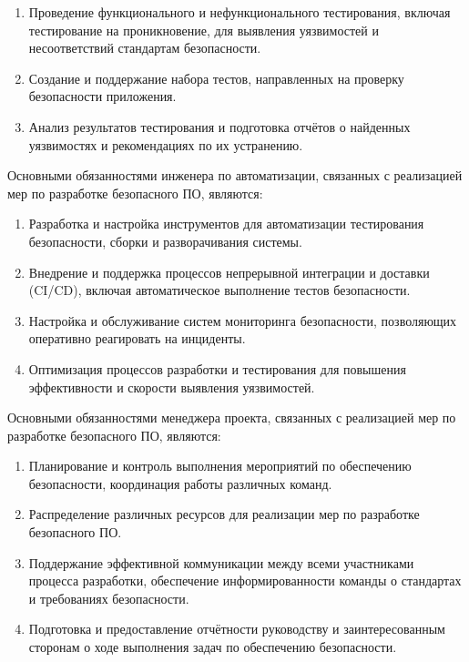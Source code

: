 \begin{enumerate}
    \item Проведение функционального и нефункционального тестирования, включая тестирование на проникновение, для выявления уязвимостей и несоответствий стандартам безопасности.
    \item Создание и поддержание набора тестов, направленных на проверку безопасности приложения.
    \item Анализ результатов тестирования и подготовка отчётов о найденных уязвимостях и рекомендациях по их устранению.
\end{enumerate}

Основными обязанностями инженера по автоматизации, связанных с реализацией мер по разработке безопасного ПО, являются:

\begin{enumerate}
    \item Разработка и настройка инструментов для автоматизации тестирования безопасности, сборки и разворачивания системы.
    \item Внедрение и поддержка процессов непрерывной интеграции и доставки (CI/CD), включая автоматическое выполнение тестов безопасности.
    \item Настройка и обслуживание систем мониторинга безопасности, позволяющих оперативно реагировать на инциденты.
    \item Оптимизация процессов разработки и тестирования для повышения эффективности и скорости выявления уязвимостей.
\end{enumerate}

Основными обязанностями менеджера проекта, связанных с реализацией мер по разработке безопасного ПО, являются:

\begin{enumerate}
    \item Планирование и контроль выполнения мероприятий по обеспечению безопасности, координация работы различных команд.
    \item Распределение различных ресурсов для реализации мер по разработке безопасного ПО.
    \item Поддержание эффективной коммуникации между всеми участниками процесса разработки, обеспечение информированности команды о стандартах и требованиях безопасности.
    \item Подготовка и предоставление отчётности руководству и заинтересованным сторонам о ходе выполнения задач по обеспечению безопасности.
\end{enumerate}

